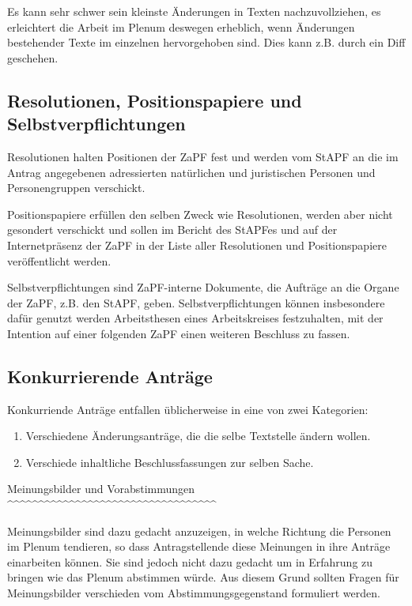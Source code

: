 \documentclass[
  a4paper,
  oneside]{scrartcl}
\providecommand{\tightlist}{%
  \setlength{\itemsep}{0pt}\setlength{\parskip}{0pt}}
\begin{document}
Es kann sehr schwer sein kleinste Änderungen in Texten nachzuvollziehen,
es erleichtert die Arbeit im Plenum deswegen erheblich, wenn Änderungen
bestehender Texte im einzelnen hervorgehoben sind. Dies kann z.B. durch
ein Diff geschehen.

\hypertarget{resolutionen-positionspapiere-und-selbstverpflichtungen}{%
\subsection*{Resolutionen, Positionspapiere und
Selbstverpflichtungen}\label{resolutionen-positionspapiere-und-selbstverpflichtungen}}

Resolutionen halten Positionen der ZaPF fest und werden vom StAPF an die
im Antrag angegebenen adressierten natürlichen und juristischen Personen
und Personengruppen verschickt.

Positionspapiere erfüllen den selben Zweck wie Resolutionen, werden aber
nicht gesondert verschickt und sollen im Bericht des StAPFes und auf der
Internetpräsenz der ZaPF in der Liste aller Resolutionen und
Positionspapiere veröffentlicht werden.

Selbstverpflichtungen sind ZaPF-interne Dokumente, die Aufträge an die
Organe der ZaPF, z.B. den StAPF, geben. Selbstverpflichtungen können
insbesondere dafür genutzt werden Arbeitsthesen eines Arbeitskreises
festzuhalten, mit der Intention auf einer folgenden ZaPF einen weiteren
Beschluss zu fassen.

\hypertarget{konkurrierende-antruxe4ge}{%
\subsection*{Konkurrierende Anträge}\label{konkurrierende-antruxe4ge}}

Konkurriende Anträge entfallen üblicherweise in eine von zwei
Kategorien:

\begin{enumerate}
\def\labelenumi{\arabic{enumi}.}
\tightlist
\item
  Verschiedene Änderungsanträge, die die selbe Textstelle ändern wollen.
\item
  Verschiede inhaltliche Beschlussfassungen zur selben Sache.
\end{enumerate}

Meinungsbilder und Vorabstimmungen
\^{}\^{}\^{}\^{}\^{}\^{}\^{}\^{}\^{}\^{}\^{}\^{}\^{}\^{}\^{}\^{}\^{}\^{}\^{}\^{}\^{}\^{}\^{}\^{}\^{}\^{}\^{}\^{}\^{}\^{}\^{}\^{}\^{}\^{}

Meinungsbilder sind dazu gedacht anzuzeigen, in welche Richtung die
Personen im Plenum tendieren, so dass Antragstellende diese Meinungen in
ihre Anträge einarbeiten können. Sie sind jedoch nicht dazu gedacht um
in Erfahrung zu bringen wie das Plenum abstimmen würde. Aus diesem Grund
sollten Fragen für Meinungsbilder verschieden vom Abstimmungsgegenstand
formuliert werden.
\end{document}
